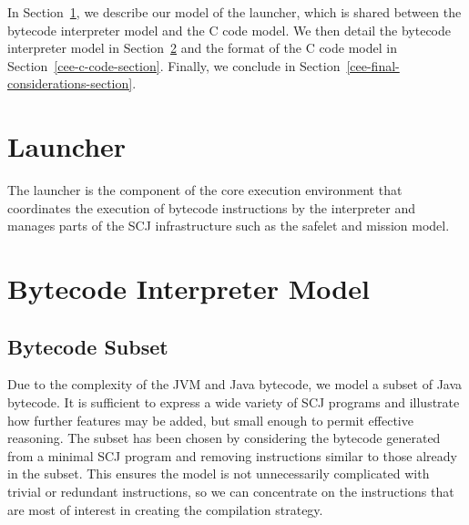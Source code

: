 In Section~\ref{cee-launcher-section}, we describe our model of the
launcher, which is shared between the bytecode interpreter model and
the C code model.
We then detail the bytecode interpreter model in
Section~\ref{cee-interpreter-section} and the format of the C code
model in Section~\ref{cee-c-code-section}.
Finally, we conclude in
Section~\ref{cee-final-considerations-section}.

\section{Launcher}
\label{cee-launcher-section}

The launcher is the component of the core execution environment
that coordinates the execution of bytecode instructions by
the interpreter and manages parts of the SCJ infrastructure such as
the safelet and mission model.



\section{Bytecode Interpreter Model}
\label{cee-interpreter-section}


\subsection{Bytecode Subset}
\label{cee-assumptions-subsection}

Due to the complexity of the JVM and Java bytecode, we model a subset
of Java bytecode.
It is sufficient to express a wide variety of SCJ programs and
illustrate how further features may be added, but small enough to
permit effective reasoning.
The subset has been chosen by considering the bytecode generated from
a minimal SCJ program and removing instructions similar to those
already in the subset.
This ensures the model is not unnecessarily complicated with trivial
or redundant instructions, so we can concentrate on the instructions
that are most of interest in creating the compilation strategy.

